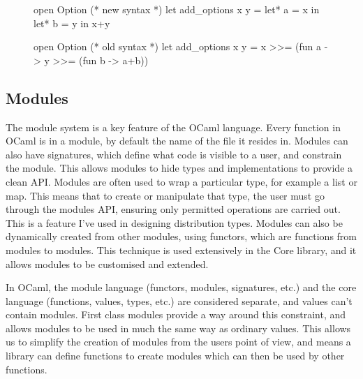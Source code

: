 \begin{figure}[!htb]
	\centering														
	\begin{minipage}{0.45\textwidth}
		\centering
		\begin{ocamlcode-in}
open Option
(* new syntax *)
let add_options x y = 
  let* a = x in
  let* b = y in
  x+y
		\end{ocamlcode-in}
	\end{minipage}
	\begin{minipage}{0.45\textwidth}
		\centering
\begin{ocamlcode-in}
open Option
(* old syntax *)
let add_options x y = 
  x >>= (fun a -> 
      y >>= (fun b ->
          a+b))
\end{ocamlcode-in}
	\end{minipage}
\end{figure}

\subsection{Modules}
The module system is a key feature of the OCaml language. Every function in OCaml is in a module, by default the name of the file it resides in. Modules can also have signatures, which define what code is visible to a user, and constrain the module. This allows modules to hide types and implementations to provide a clean API. Modules are often used to wrap a particular type, for example a list or map. This means that to create or manipulate that type, the user must go through the modules API, ensuring only permitted operations are carried out. This is a feature I've used in designing distribution types. Modules can also be dynamically created from other modules, using functors, which are functions from modules to modules. This technique is used extensively in the Core library, and it allows modules to be customised and extended.
	
In OCaml, the module language (functors, modules, signatures, etc.) and the core language (functions, values, types, etc.) are considered separate, and values can't contain modules. First class modules provide a way around this constraint, and allows modules to be used in much the same way as ordinary values. This allows us to simplify the creation of modules from the users point of view, and means a library can define functions to create modules which can then be used by other functions.
	
